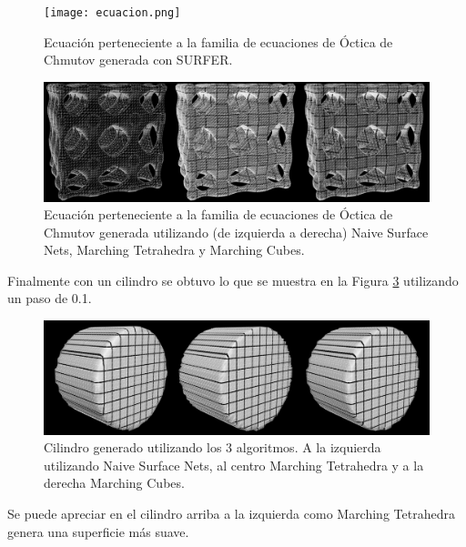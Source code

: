 \documentclass[12pt]{article}
\begin{document}
\begin{figure}[h!]
\texttt{[image: ecuacion.png]}
\caption{Ecuación  perteneciente a la familia de ecuaciones de Óctica de Chmutov generada con SURFER.}
\label{CHSURFER}
\end{figure}

\begin{figure}[h!]
\includegraphics[width=\linewidth,center]{compec2.png}
\caption{Ecuación perteneciente a la familia de ecuaciones de Óctica de Chmutov generada utilizando (de izquierda a derecha)  Naive Surface Nets, Marching Tetrahedra y  Marching Cubes.}
  \label{ecuacionG}
\end{figure}

Finalmente con un cilindro se obtuvo lo que se muestra en la Figura \ref{cilindro1G}  utilizando un paso de 0.1.

\begin{figure}[h!]
\includegraphics[width=\linewidth,center]{compec3.png}
\caption{Cilindro generado utilizando los 3 algoritmos.  A la izquierda utilizando Naive Surface Nets, al centro Marching Tetrahedra y a la derecha Marching Cubes.}
  \label{cilindro1G}
\end{figure}

Se puede apreciar en el cilindro arriba a la izquierda como Marching Tetrahedra genera una superficie más suave.
\end{document}
